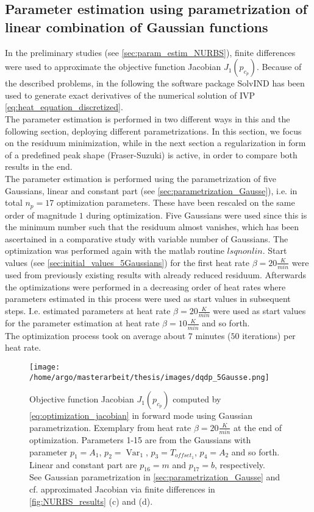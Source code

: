 \documentclass{scrartcl}[12pt, halfparskip]
\numberwithin{equation}{section}
\numberwithin{figure}{section}
\numberwithin{table}{section}
\newcommand{\var}{\operatorname{Var}}
\begin{document}
\subsection{Parameter estimation using parametrization of linear combination of Gaussian functions}
\label{sec:param_estimation_5Gausse}
In the preliminary studies (see \cref{sec:param_estim_NURBS}), finite differences were used to approximate the objective function Jacobian $J_1(p_{c_p})$. 
Because of the described problems, in the following the software package SolvIND has been used to generate exact derivatives of the numerical solution of IVP \cref{eq:heat_equation_discretized}. \\
The parameter estimation is performed in two different ways in this and the following section, deploying different parametrizations. In this section, we focus on the residuum minimization, while in the next section a regularization in form of a predefined peak shape (Fraser-Suzuki) is active, in order to compare both results in the end. \\
The parameter estimation is performed using the parametrization of five Gaussians, linear and constant part (see \cref{sec:parametrization_Gausse}), i.e. in total $n_p=17$ optimization parameters. These have been rescaled on the same order of magnitude $1$ during optimization.
Five Gaussians were used since this is the minimum number such that the residuum almost vanishes, which has been ascertained in a comparative study with variable number of Gaussians. 
The optimization was performed again with the matlab routine $lsqnonlin$. Start values (see \cref{sec:initial_values_5Gaussians}) for the first heat rate $\beta = 20 \frac{K}{min}$ were used from previously existing results with already reduced residuum. 
Afterwards the optimizations were performed in a decreasing order of heat rates where parameters estimated in this process were used as start values in subsequent steps. 
I.e. estimated parameters at heat rate $\beta=20 \frac{K}{min}$ were used as start values for the parameter estimation at heat rate $\beta=10 \frac{K}{min}$ and so forth. \\
The optimization process took on average about $7$ minutes ($50$ iterations) per heat rate.


\begin{figure}[H]
	\centering
	\texttt{[image: /home/argo/masterarbeit/thesis/images/dqdp\_5Gausse.png]}
	\caption{Objective function Jacobian $J_1(p_{c_p})$ computed by \cref{eq:optimization_jacobian} in forward mode using Gaussian parametrization. Exemplary from heat rate $\beta=20 \frac{K}{min}$ at the end of optimization. Parameters 1-15 are from the Gaussians with parameter $p_1 = A_1$, $p_2 = \var_1$, $p_3 = T_{offset_1}$, $p_4 = A_2$ and so forth. Linear and constant part are $p_{16}=m$ and $p_{17}=b$, respectively. \\
	See Gaussian parametrization in \cref{sec:parametrization_Gausse} and cf. approximated Jacobian via finite differences in \cref{fig:NURBS_results} (c) and (d).}
	\label{fig:dqdp_5Gausse}
\end{figure}
\end{document}
